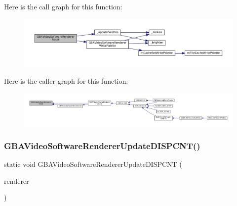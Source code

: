 Here is the call graph for this function\+:
\nopagebreak
\begin{figure}[H]
\begin{center}
\leavevmode
\includegraphics[width=350pt]{video-software_8c_ad9b2accf87f8b85ec8976ac94bc5b6d1_cgraph}
\end{center}
\end{figure}
Here is the caller graph for this function\+:
\nopagebreak
\begin{figure}[H]
\begin{center}
\leavevmode
\includegraphics[width=350pt]{video-software_8c_ad9b2accf87f8b85ec8976ac94bc5b6d1_icgraph}
\end{center}
\end{figure}
\mbox{\label{video-software_8c_af42a52538b50022349db835033b5a120}} 
\subsubsection{\texorpdfstring{G\+B\+A\+Video\+Software\+Renderer\+Update\+D\+I\+S\+P\+C\+N\+T()}{GBAVideoSoftwareRendererUpdateDISPCNT()}}
{\footnotesize\ttfamily static void G\+B\+A\+Video\+Software\+Renderer\+Update\+D\+I\+S\+P\+C\+NT (\begin{DoxyParamCaption}\item[{struct G\+B\+A\+Video\+Software\+Renderer $\ast$}]{renderer }\end{DoxyParamCaption})\hspace{0.3cm}{\ttfamily [static]}}

